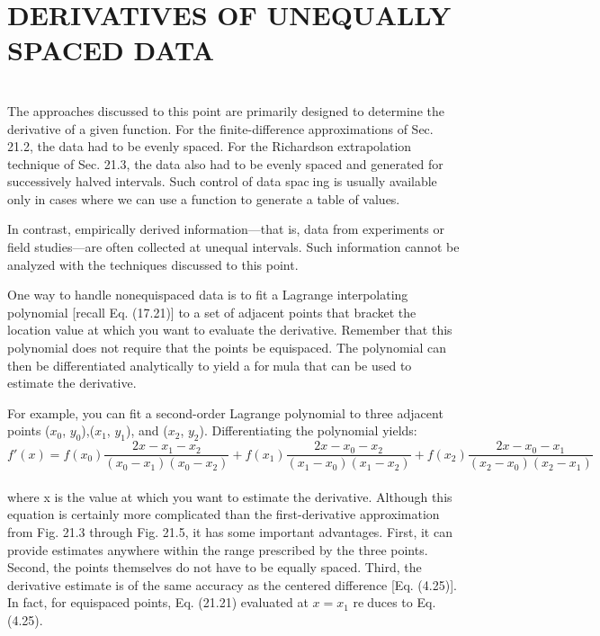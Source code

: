 \vspace{0,6in}
\chapter{DERIVATIVES OF UNEQUALLY SPACED DATA}
\vspace{0,1in}
\hline\\
\vspace{0,1in}
The approaches discussed to this point are primarily designed to determine the derivative of
a given function. For the finite-difference approximations of Sec. 21.2, the data had to be
evenly spaced. For the Richardson extrapolation technique of Sec. 21.3, the data also had to
be evenly spaced and generated for successively halved intervals. Such control of data spacing is usually available only in cases where we can use a function to generate a table of values.

In contrast, empirically derived information—that is, data from experiments or field
studies—are often collected at unequal intervals. Such information cannot be analyzed
with the techniques discussed to this point.

One way to handle nonequispaced data is to fit a Lagrange interpolating polynomial
[recall Eq. (17.21)] to a set of adjacent points that bracket the location value at which you
want to evaluate the derivative. Remember that this polynomial does not require that the
points be equispaced. The polynomial can then be differentiated analytically to yield a formula that can be used to estimate the derivative.

For example, you can fit a second-order Lagrange polynomial to three adjacent points
($x_{0}$, $y_{0}$),($x_{1}$, $y_{1}$), and ($x_{2}$, $y_{2}$). Differentiating the polynomial yields:
\begin{equation}
	\tag{21.21}
	f'(x) = f(x_{0})\dfrac{2x - x_{1} - x_{2}}{(x_{0} - x_{1}) (x_{0} - x_{2})} + f(x_{1})\dfrac{2x - x_{0} - x_{2}}{(x_{1}-x_{0})(x_{1} - x_{2})} + f(x_{2})\dfrac{2x-x_{0} - x_{1}}{(x_{2} - x_{0}) (x_{2} - x_{1})}
\end{equation}\\
where x is the value at which you want to estimate the derivative. Although this equation is
certainly more complicated than the first-derivative approximation from Fig. 21.3 through
Fig. 21.5, it has some important advantages. First, it can provide estimates anywhere
within the range prescribed by the three points. Second, the points themselves do not have
to be equally spaced. Third, the derivative estimate is of the same accuracy as the centered
difference [Eq. (4.25)]. In fact, for equispaced points, Eq. (21.21) evaluated at $x = x_{1}$ reduces to Eq. (4.25).

